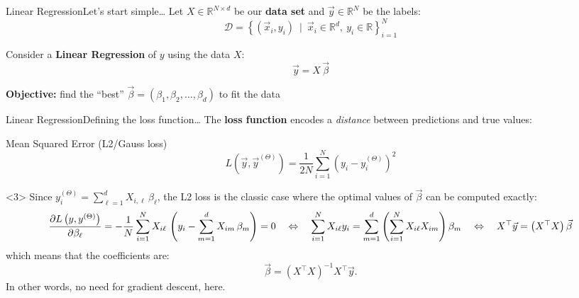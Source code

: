 \begin{frame}{Linear Regression}{Let's start simple\dots}
    Let $X \in \mathbb{R}^{N \times d}$ be our \textbf{data set} and $\vec{y} \in \mathbb{R}^N$ be the labels:
    \begin{equation*}
        \mathcal{D} = \left\{ (\vec{x}_i, y_i) ~\mid~ \vec{x}_i \in \mathbb{R}^d,~ y_i \in \mathbb{R} \right\}_{i = 1}^N
    \end{equation*}

    \vfill \pause

    Consider a \textbf{Linear Regression} of $y$ using the data $X$:
    \begin{equation*}
        \vec{y} = X\, \vec{\beta}
    \end{equation*}

    \textbf{Objective:} find the \enquote{best} $\vec{\beta} = (\beta_1, \beta_2, \dots, \beta_d)$ to fit the data
\end{frame}

\begin{frame}{Linear Regression}{Defining the loss function\dots}
    The \textbf{loss function} encodes a \emph{distance} between predictions and true values:

    \vfill \pause

    \begin{block}{Mean Squared Error (L2/Gauss loss)}
        \begin{equation*}
            L\left(\vec{y}, \vec{y}^{(\Theta)}\right)
            =
            \frac{1}{2N} \sum\limits_{i = 1}^N \left(y_i - y^{(\Theta)}_i\right)^2
        \end{equation*}
    \end{block}

    \begin{onlyenv}<3>
        {\tiny
        \textcolor{CEAblack!65}{%
        Since $y_i^{(\Theta)} = \sum\limits_{\ell = 1}^d X_{i, \ell}\, \beta_{\ell}$, the L2 loss is the classic case where the optimal values of $\vec{\beta}$ can be computed exactly:
        \begin{equation*}
            \pdv{L\left(y, y^{(\Theta)}\right)}{\beta_{\ell}}
            =
            -\frac{1}{N} \sum\limits_{i = 1}^N X_{i\ell}\, \left(y_i - \sum\limits_{m = 1}^d X_{im}\, \beta_{m}\right)
            =
            0
            \quad \Leftrightarrow \quad
            \sum\limits_{i = 1}^N X_{i\ell} y_i
            =
            \sum\limits_{m = 1}^d \left( \sum\limits_{i = 1}^N X_{i\ell} X_{im} \right) \beta_{m}
            \quad \Leftrightarrow \quad
            X^{\top} \vec{y} = \left( X^{\top} X \right) \vec{\beta}
        \end{equation*}
        which means that the coefficients are:
        \begin{equation*}
            \vec{\beta}
            =
            \left( X^{\top} X \right)^{-1} X^{\top} \vec{y}.
        \end{equation*}
        In other words, no need for gradient descent, here.
        }
        }
    \end{onlyenv}
\end{frame}

